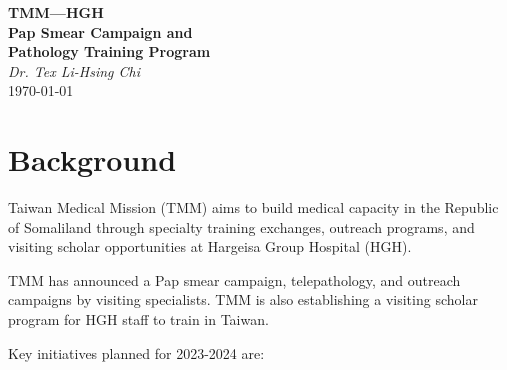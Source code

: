 \documentclass{article}
\begin{document}

%    


\noindent
\begin{minipage}{0.2\textwidth}
\centering

\end{minipage}
\hfill
\begin{minipage}{0.75\textwidth}
\centering
{\LARGE\bfseries TMM---HGH \\ 
Pap Smear Campaign and \\
Pathology Training Program }\\[1ex]
\large\textit{Dr. Tex Li-Hsing Chi}\\[2ex]
\today
\end{minipage}


\section{Background}
Taiwan Medical Mission (TMM) aims to build medical capacity in the Republic of Somaliland through specialty training exchanges, outreach programs, and visiting scholar opportunities at Hargeisa Group Hospital (HGH).

TMM has announced a Pap smear campaign, telepathology, and outreach campaigns by visiting specialists.
TMM is also establishing a visiting scholar program for HGH staff to train in Taiwan.

Key initiatives planned for 2023-2024 are:
\end{document}
